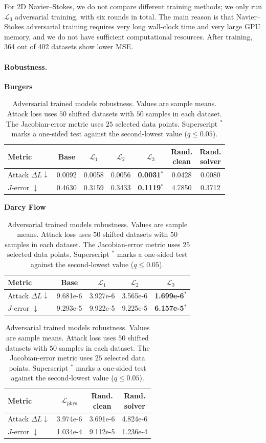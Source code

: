 ﻿\documentclass[letterpaper]{article} %
\begin{document}
For 2D Navier--Stokes, we do not compare different training methods; we only
run \(\mathcal L_3\) adversarial training, with six rounds in total. The main
reason is that Navier--Stokes adversarial training requires very long
wall-clock time and very large GPU memory, and we do not have sufficient
computational resources. After training, 364 out of 402 datasets show lower
MSE.

\paragraph{Robustness.}
\begin{table}[t]
\centering
\normalsize
\setlength{\tabcolsep}{5pt}
\textbf{Burgers}\\[0.2em]
\setlength{\tabcolsep}{1.4pt}
\begin{tabular}{@{}lcccccc@{}}
\toprule
Metric & Base & \(\mathcal L_1\) & \(\mathcal L_2\) &
\(\mathcal L_3\) & \shortstack{Rand.\\clean} & \shortstack{Rand.\\solver} \\
\midrule
Attack \(\Delta L\downarrow\) &
0.0092 & 0.0058 & 0.0056 & \textbf{0.0031}\(^{*}\) & 0.0428 & 0.0080 \\
\(J\)-error \(\downarrow\) &
0.4630 & 0.3159 & 0.3433 & \textbf{0.1119}\(^{*}\) & 4.7850 & 0.3712 \\
\bottomrule
\end{tabular}

\vspace{0.05em}
\textbf{Darcy Flow}\\[0.2em]
\setlength{\tabcolsep}{3pt}
\begin{tabular}{@{}lcccc@{}}
\toprule
Metric & Base & \(\mathcal L_1\) & \(\mathcal L_2\) &
\(\mathcal L_3\) \\
\midrule
Attack \(\Delta L\downarrow\) &
9.681e-6 & 3.927e-6 & 3.565e-6 & \textbf{1.699e-6}\(^{*}\) \\
\(J\)-error \(\downarrow\) &
9.293e-5 & 9.922e-5 & 9.225e-5 & \textbf{6.157e-5}\(^{*}\) \\
\bottomrule
\end{tabular}

\vspace{0.05em}
\begin{tabular}{@{}lccc@{}}
\toprule
Metric & \(\mathcal L_{\mathrm{phys}}\) &
\shortstack{Rand.\\clean} & \shortstack{Rand.\\solver} \\
\midrule
Attack \(\Delta L\downarrow\) & 3.974e-6 & 3.691e-6 & 4.824e-6 \\
\(J\)-error \(\downarrow\) & 1.034e-4 & 9.112e-5 & 1.236e-4 \\
\bottomrule
\end{tabular}
\caption{Adversarial trained models robustness. Values are sample means.
Attack loss uses \(50\) shifted datasets with \(50\)
samples in each dataset.  The Jacobian-error metric uses \(25\) selected
data points.  Superscript \(^{*}\) marks a one-sided test against the
second-lowest value (\(q\le 0.05\)).}
\label{tab:adversarial_training_robustness_summary}
\end{table}
\end{document}
